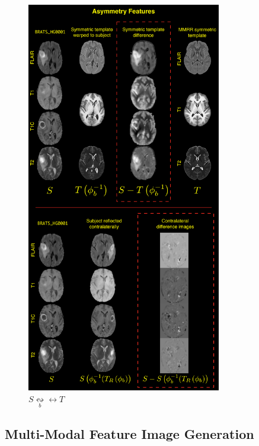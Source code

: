 \documentclass[final,5p,times,twocolumn]{elsarticle}
\begin{document}
{\color{red}{Need to describe the actual feature images}}





\begin{figure}[!htb]
  \centering
    \includegraphics[width=85mm]{Figures/asymmetryFeatureImages2.pdf}
  \caption{ $S \underset{b}{\leftrightsquigarrow} \leftrightarrow T$
          }
  \label{fig:asymmetryFeatures}
\end{figure}





\subsection{Multi-Modal Feature Image Generation}
\end{document}
